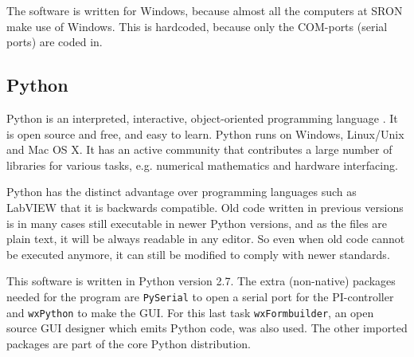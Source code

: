 The software is written for Windows, because almost all the computers at SRON make use of Windows. This is hardcoded, because only the COM-ports (serial ports) are coded in.

\subsection{Python}
Python is an interpreted, interactive, object-oriented programming language \cite{python}. It is open source and free, and easy to learn. Python runs on Windows, Linux/Unix and Mac OS X. It has an active community that contributes a large number of libraries for various tasks, e.g. numerical mathematics and hardware interfacing.

Python has the distinct advantage over programming languages such as LabVIEW that it is backwards compatible. Old code written in previous versions is in many cases still executable in newer Python versions, and as the files are plain text, it will be always readable in any editor. So even when old code cannot be executed anymore, it can still be modified to comply with newer standards.

This software is written in Python version 2.7. The extra (non-native) packages needed for the program are \verb!PySerial! to open a serial port for the PI-controller and \verb!wxPython! to make the GUI. For this last task \verb!wxFormbuilder!, an open source GUI designer which emits Python code, was also used. The other imported packages are part of the core Python distribution.
